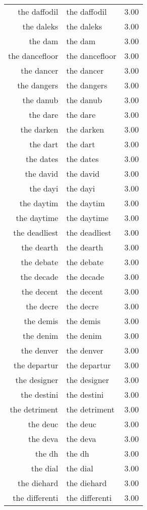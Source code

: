 \begin{table}[ht]
\begin{tabular}{rlr}
  the daffodil & the daffodil & 3.00 \\ 
  the daleks & the daleks & 3.00 \\ 
  the dam & the dam & 3.00 \\ 
  the dancefloor & the dancefloor & 3.00 \\ 
  the dancer & the dancer & 3.00 \\ 
  the dangers & the dangers & 3.00 \\ 
  the danub & the danub & 3.00 \\ 
  the dare & the dare & 3.00 \\ 
  the darken & the darken & 3.00 \\ 
  the dart & the dart & 3.00 \\ 
  the dates & the dates & 3.00 \\ 
  the david & the david & 3.00 \\ 
  the dayi & the dayi & 3.00 \\ 
  the daytim & the daytim & 3.00 \\ 
  the daytime & the daytime & 3.00 \\ 
  the deadliest & the deadliest & 3.00 \\ 
  the dearth & the dearth & 3.00 \\ 
  the debate & the debate & 3.00 \\ 
  the decade & the decade & 3.00 \\ 
  the decent & the decent & 3.00 \\ 
  the decre & the decre & 3.00 \\ 
  the demis & the demis & 3.00 \\ 
  the denim & the denim & 3.00 \\ 
  the denver & the denver & 3.00 \\ 
  the departur & the departur & 3.00 \\ 
  the designer & the designer & 3.00 \\ 
  the destini & the destini & 3.00 \\ 
  the detriment & the detriment & 3.00 \\ 
  the deuc & the deuc & 3.00 \\ 
  the deva & the deva & 3.00 \\ 
  the dh & the dh & 3.00 \\ 
  the dial & the dial & 3.00 \\ 
  the diehard & the diehard & 3.00 \\ 
  the differenti & the differenti & 3.00 \\ 

\end{tabular}
\end{table}

